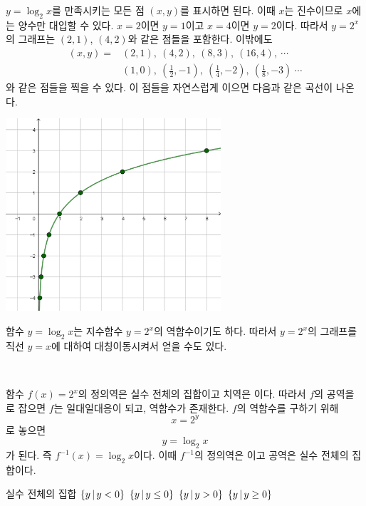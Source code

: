 \documentclass{oblivoir}
\begin{document}
%
\label{log1}
\begin{mdframed}
\(y=\log_2x\)를 만족시키는 모든 점 \((x,y)\)를 표시하면 된다.
이때 \(x\)는 진수이므로 \(x\)에는 양수만 대입할 수 있다.
\(x=2\)이면 \(y=1\)이고 \(x=4\)이면 \(y=2\)이다.
따라서 \(y=2^x\)의 그래프는 \((2,1)\), \((4,2)\)와 같은 점들을 포함한다.
이밖에도
\begin{align*}
(x,y)
=&\textstyle(2,1),\:(4,2),\:(8,3),\:(16,4),\:\cdots\\
&\textstyle(1,0),\:(\frac12,-1),\:(\frac14,-2),\:(\frac18,-3)\:\cdots
\end{align*}
와 같은 점들을 찍을 수 있다.
이 점들을 자연스럽게 이으면 다음과 같은 곡선이 나온다.
\begin{center}
\includegraphics[width=0.6\textwidth]{log_1}
\end{center}
\end{mdframed}

\bigskip\bigskip
함수 \(y=\log_2x\)는 지수함수 \(y=2^x\)의 역함수이기도 하다.
따라서 \(y=2^x\)의 그래프를 직선 \(y=x\)에 대하여 대칭이동시켜서 얻을 수도 있다.

\newpage
%
\label{log2}\\[-30pt]
\begin{mdframed}[innertopmargin=5pt]
함수 \(f(x)=2^x\)의 정의역은 실수 전체의 집합이고 치역은 이다.
따라서 \(f\)의 공역을 로 잡으면 \(f\)는 일대일대응이 되고, 역함수가 존재한다.
\(f\)의 역함수를 구하기 위해
\[x=2^y\]
로 놓으면
\[y=\log_2x\]
가 된다.
즉 \(f^{-1}(x)=\log_2x\)이다.
이때 \(f^{-1}\)의 정의역은 이고 공역은 실수 전체의 집합이다.
\end{mdframed}
\tabb
{실수 전체의 집합}
{\(\{y\,|\, y<0\}\)}
{\(\{y\,|\, y\le0\}\)}
{\(\{y\,|\, y>0\}\)}
{\(\{y\,|\, y\ge0\}\)}
\end{document}
